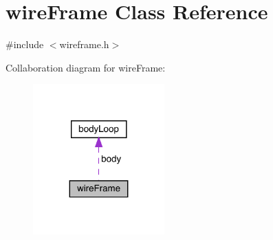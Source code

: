 \hypertarget{classwire_frame}{}\section{wire\+Frame Class Reference}
\label{classwire_frame}


{\ttfamily \#include $<$wireframe.\+h$>$}



Collaboration diagram for wire\+Frame\+:
\nopagebreak
\begin{figure}[H]
\begin{center}
\leavevmode
\includegraphics[width=143pt]{classwire_frame__coll__graph}
\end{center}
\end{figure}
